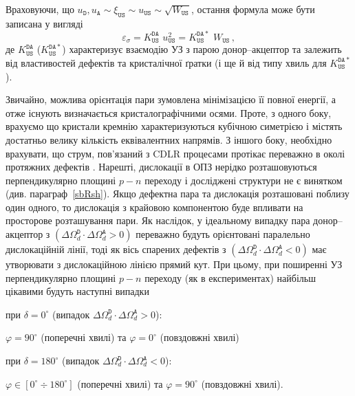 Враховуючи, що $u_\mathtt{D},u_\mathtt{A}\sim \xi_\mathtt{US}\sim u_\mathtt{US}\sim \sqrt{W_\mathtt{US}}$,
остання формула може бути записана у вигляді
\begin{equation}
\label{eqEpsSigUS}
\varepsilon_{\sigma}=K_\mathtt{US}^\mathtt{DA}\,\,u_{\mathtt{US}}^2=K_\mathtt{US}^\mathtt{DA*}\,\,W_{\mathtt{US}}\,,
\end{equation}
де $K_\mathtt{US}^\mathtt{DA}$ ($K_\mathtt{US}^\mathtt{DA*}$) характеризує взаємодію УЗ з парою донор--акцептор
та залежить від властивостей дефектів та кристалічної ґратки (і ще й від типу хвиль для $K_\mathtt{US}^\mathtt{DA*}$).

Звичайно, можлива орієнтація пари зумовлена мінімізацією її повної енергії, а отже існують визначається кристалографічними осями.
Проте, з одного боку, врахуємо що кристали кремнію характеризуються кубічною симетрією і містять достатньо велику кількість еквівалентних напрямів.
З  іншого боку, необхідно врахувати,
що струм, пов'язаний з CDLR процесами протікає переважно в околі протяжних дефектів \cite{CDLR:JAP,CDLR:SSP}.
Нарешті, дислокації в ОПЗ нерідко розташовуються перпендикулярно площині $p-n$ переходу
і досліджені структури не є винятком (див. параграф~\ref{sbRsh}).
Якщо дефектна пара та дислокація розташовані поблизу один одного, то дислокація з крайовою компонентою буде впливати на просторове розташування пари.
Як наслідок, у ідеальному випадку пара донор--акцептор з  $(\Delta\Omega_d^\mathtt{D}\cdot\Delta\Omega_d^\mathtt{A}>0)$ переважно будуть орієнтовані
паралельно дислокаційній лінії,
тоді як вісь спарених дефектів з $(\Delta\Omega_d^\mathtt{D}\cdot\Delta\Omega_d^\mathtt{A}<0)$ має утворювати з дислокаційною лінією прямий кут.
При цьому, при поширенні УЗ перпендикулярно площині $p-n$ переходу (як в експериментах)
найбільш цікавими будуть наступні випадки

\noindent при  $\delta=0^\circ$ (випадок $\Delta\Omega_d^\mathtt{D}\cdot\Delta\Omega_d^\mathtt{A}>0$):
\begin{center}
\noindent   $\varphi=90^\circ$ (поперечні хвилі)  та $\varphi=0^\circ$ (повздовжні хвилі)
\end{center}

\noindent при  $\delta=180^\circ$ (випадок $\Delta\Omega_d^\mathtt{D}\cdot\Delta\Omega_d^\mathtt{A}<0$):
\begin{center}
\noindent   $\varphi\in[0^\circ\div 180^\circ]$ (поперечні хвилі)  та $\varphi=90^\circ$ (повздовжні хвилі).
\end{center}

